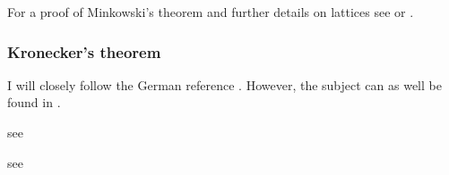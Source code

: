 For a proof of Minkowski's theorem and further details on lattices see
\cite[4.4, p.~28]{Neukirch2006} or \cite[Thm.~4.19]{Milne2017}.

\subsubsection{Kronecker's theorem}

I will closely follow the German reference \cite[Chap.~2]{Hlawka1986}. However,
the subject can as well be found in \cite[see][Chap.~\textsc{XXIII}]{Hardy1975}.


\begin{thm}\label{thm:Dirichlet}
    see \cite[Thm.~5.1]{Milne2017}
\end{thm}

\begin{thm}
    see \cite[§ 66]{Meara2000}
\end{thm}
